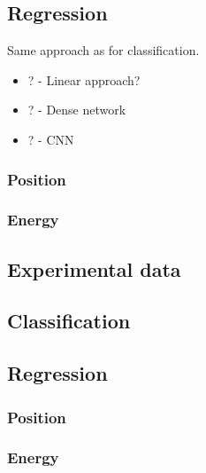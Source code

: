 \subsection{Regression}
Same approach as for classification.
\begin{itemize}
  \item ? - Linear approach?
  \item ? - Dense network
  \item ? - CNN
\end{itemize}
\subsubsection{Position}
\subsubsection{Energy}
\subsection{Experimental data}
\subsection{Classification}
\subsection{Regression}
\subsubsection{Position}
\subsubsection{Energy}
